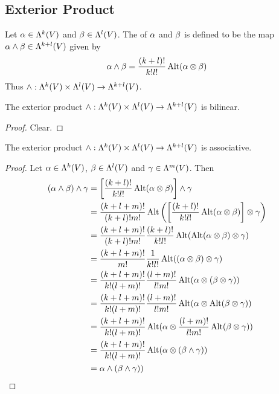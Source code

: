 \documentclass{book}
\begin{document}
	
	
	
	
	
	
	
	
	
	
	
	
	
	
	
	
	
	
	
	
	\subsection{Exterior Product}
	
	\begin{defn}
		Let $\alpha \in \Lambda^k(V)$ and $\beta \in \Lambda^l(V)$. The  of $\alpha$ and $\beta$ is defined to be the map $\alpha \wedge \beta \in \Lambda^{k+l}(V)$ given by $$\alpha \wedge \beta = \frac{(k+l)!}{k! l!} \operatorname{Alt}(\alpha \otimes \beta)$$ 
		Thus $\wedge: \Lambda^k(V) \times \Lambda^l(V) \rightarrow \Lambda^{k+l}(V)$.
	\end{defn}

	\begin{ex}
		The exterior product $\wedge: \Lambda^k(V) \times \Lambda^l(V) \rightarrow \Lambda^{k+l}(V)$ is bilinear.
	\end{ex}
	
	\begin{proof}
		Clear.
	\end{proof}

	\begin{ex}
		The exterior product $\wedge: \Lambda^k(V) \times \Lambda^l(V) \rightarrow \Lambda^{k+l}(V)$ is associative. 
	\end{ex}

	\begin{proof}
		Let $\alpha \in \Lambda^k(V)$, $\beta \in \Lambda^l(V)$ and $\gamma \in \Lambda^m(V)$. Then 
		\begin{align*}
			(\alpha \wedge \beta) \wedge \gamma
			&= \bigg [ \frac{(k+l)!}{k! l!} \operatorname{Alt}(\alpha \otimes \beta) \bigg] \wedge \gamma \\ 
			&= \frac{(k+l+m)!}{(k+l)!m!} \operatorname{Alt} \bigg( \bigg [ \frac{(k+l)!}{k! l!} \operatorname{Alt}(\alpha \otimes \beta) \bigg] \otimes \gamma \bigg)  \\ 
			&= \frac{(k+l+m)!}{(k+l)!m!}  \frac{(k+l)!}{k!l!}\operatorname{Alt}(\operatorname{Alt}(\alpha \otimes \beta) \otimes \gamma) \\
			&= \frac{(k+l+m)!}{m!}  \frac{1}{k!l!} \operatorname{Alt}((\alpha \otimes \beta) \otimes \gamma) \\
			&= \frac{(k+l+m)!}{k!(l+m)!}  \frac{(l+m)!}{l!m!} \operatorname{Alt}(\alpha \otimes (\beta \otimes \gamma)) \\
			&= \frac{(k+l+m)!}{k!(l+m)!}  \frac{(l+m)!}{l!m!} \operatorname{Alt}(\alpha \otimes \operatorname{Alt}(\beta \otimes \gamma)) \\
			&= \frac{(k+l+m)!}{k!(l+m)!} \operatorname{Alt}(\alpha \otimes \frac{(l+m)!}{l!m!} \operatorname{Alt}(\beta \otimes \gamma)) \\
			&= \frac{(k+l+m)!}{k!(l+m)!} \operatorname{Alt}(\alpha \otimes (\beta \wedge \gamma)) \\
			&= \alpha \wedge (\beta \wedge \gamma)) \\
		\end{align*}
	\end{proof}
	
\end{document}
